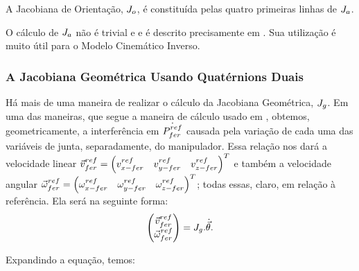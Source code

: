 A Jacobiana de Orientação, $\jacob_{o}$, é constituída pelas quatro
primeiras linhas de $\jacob_{a}$.

O cálculo de $\jacob_{a}$ não é trivial e e é descrito precisamente
em \cite{Adorno2011}. Sua utilização é muito útil para o Modelo Cinemático
Inverso.


\subsubsection{A Jacobiana Geométrica Usando Quatérnions Duais\label{sub:SchunkRBJacobianaGeometrica}}

Há mais de uma maneira de realizar o cálculo da Jacobiana Geométrica,
$\jacob_{g}$. Em uma das maneiras, que segue a maneira de cálculo
usado em \cite{book:siciliano:2009}, obtemos, geometricamente, a
interferência em $\dot{\pose{ref}{fer}}$ causada pela variação de
cada uma das variáveis de junta, separadamente, do manipulador. Essa
relação nos dará a velocidade linear $\vect v_{fer}^{ref}=\begin{pmatrix}v_{x-fer}^{ref} & v_{y-fer}^{ref} & v_{z-fer}^{ref}\end{pmatrix}^{T}$
e também a velocidade angular $\vect{\omega}_{fer}^{ref}=\begin{pmatrix}\omega_{x-fer}^{ref} & \omega_{y-fer}^{ref} & \omega_{z-fer}^{ref}\end{pmatrix}^{T}$;
todas essas, claro, em relação à referência. Ela será na seguinte
forma:
\begin{equation}
\begin{pmatrix}\vect v_{fer}^{ref}\\
\vect{\omega}_{fer}^{ref}
\end{pmatrix}=\jacob_{g}.\dot{\vect{\theta}}.
\end{equation}


Expandindo a equação, temos:

